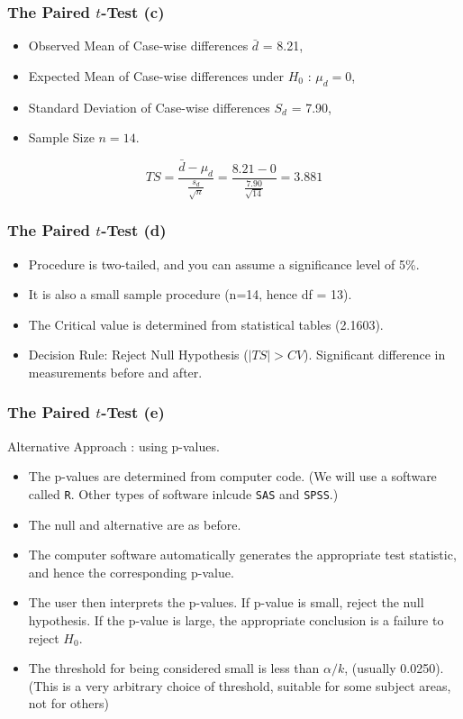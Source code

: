 \begin{frame}[fragile]
\frametitle{The Paired $t$-Test (c)}
\begin{itemize}
\item Observed Mean of Case-wise differences $\bar{d}$ = 8.21,
\item Expected Mean of Case-wise differences under $H_0$ : $\mu_d = 0$,
\item Standard Deviation of Case-wise differences $S_d$ = 7.90,
\item Sample Size $n=14$.
\end{itemize}

\[ TS = \frac{\bar{d} - \mu_d}{\frac{s_d}{\sqrt{n}}} = \frac{8.21 - 0}{\frac{7.90}{\sqrt{14}}} = 3.881 \]
\end{frame}
\begin{frame}[fragile]
\frametitle{The Paired $t$-Test (d)}

\begin{itemize}
\item Procedure is two-tailed, and you can assume a significance level of 5\%.
\item It is also a small sample procedure (n=14, hence df = 13).
\item The Critical value is determined from statistical tables (2.1603).
\item Decision Rule: Reject Null Hypothesis ($|TS|>CV$). Significant difference in measurements before and after.
\end{itemize}

\end{frame}
\begin{frame}[fragile]
\frametitle{The Paired $t$-Test (e)}
Alternative Approach : using p-values.
\begin{itemize}
\item The p-values are determined from computer code. (We will use a software called \texttt{R}. Other types of software inlcude \texttt{SAS} and \texttt{SPSS}.)
\item The null and alternative are as before.
\item The computer software automatically generates the appropriate test statistic, and hence the corresponding p-value.
\item The user then interprets the p-values. If p-value is small, reject the null hypothesis. If the p-value is large, the appropriate conclusion is a failure to reject $H_0$.
\item The threshold for being considered small is less than $\alpha/k$, (usually 0.0250). (This is a very arbitrary choice of threshold, suitable for some subject areas, not for others)
\end{itemize}
\end{frame}
